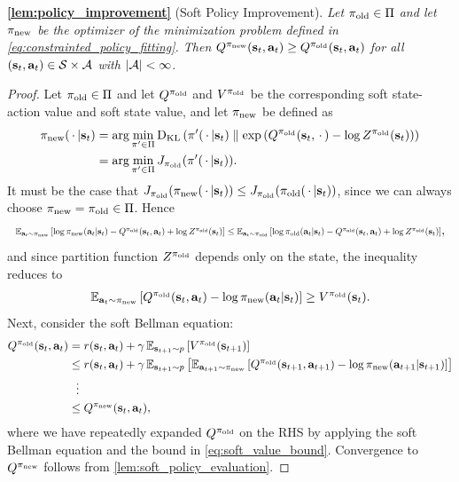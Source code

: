 \textbf{\autoref{lem:policy_improvement}} (Soft Policy Improvement).\textit{
Let $\pi_\mathrm{old} \in \Pi$ and let $\pi_\mathrm{new}$ be the optimizer of the minimization problem defined in \autoref{eq:constrainted_policy_fitting}. Then $Q^{\pi_\mathrm{new}}({\mathbf{s}_t}, {\mathbf{a}_t}) \geq Q^{\pi_\mathrm{old}}({\mathbf{s}_t}, {\mathbf{a}_t})$ for all $({\mathbf{s}_t}, {\mathbf{a}_t}) \in \mathcal{S}\times\mathcal{A}$ with $|\mathcal{A}|<\infty$.}
\begin{proof}
Let ${\pi_\mathrm{old}}\in \Pi$ and let $Q^{\pi_\mathrm{old}}$ and $V^{\pi_\mathrm{old}}$ be the corresponding soft state-action value and soft state value, and let ${\pi_\mathrm{new}}$ be defined as 
\begin{align}
{\pi_\mathrm{new}}({\,\cdot\,}|{\mathbf{s}_t}) &= \arg \min_{\pi' \in \Pi}\mathrm{D_{KL}}\left(\pi'({\,\cdot\,}|{\mathbf{s}_t})\;\middle\|\;\exp\left(Q^{\pi_\mathrm{old}}({\mathbf{s}_t},{\,\cdot\,}) - \log Z^{\pi_\mathrm{old}}({\mathbf{s}_t})\right)\right)\notag\\
 &= \arg\min_{\pi'\in\Pi}J_{\pi_\mathrm{old}}(\pi'({\,\cdot\,}|{\mathbf{s}_t})).
\end{align}
It must be the case that $J_{\pi_\mathrm{old}}({\pi_\mathrm{new}}({\,\cdot\,}|{\mathbf{s}_t})) \leq J_{\pi_\mathrm{old}}({\pi_\mathrm{old}}({\,\cdot\,}|{\mathbf{s}_t}))$, since we can always choose ${\pi_\mathrm{new}} = {\pi_\mathrm{old}}\in\Pi$. Hence
\begin{align}
\resizebox{1\textwidth}{!}{$
\E{\at\sim\policynew}{\log \policynew(\at|\st) - Q^\policyold(\st, \at) + \log Z^\policyold(\st)}
\leq \E{\at\sim\policyold}{\log \policyold(\at|\st) - Q^\policyold(\st,\at) + \log Z^\policyold(\st)}$},
\end{align}
and since partition function $Z^{\pi_\mathrm{old}}$ depends only on the state, the inequality reduces to
\begin{align}
\operatorname{\mathbb{E}}_{{\mathbf{a}_t}\sim{\pi_\mathrm{new}}}\left[Q^{\pi_\mathrm{old}}({\mathbf{s}_t}, {\mathbf{a}_t}) - \log {\pi_\mathrm{new}}({\mathbf{a}_t}|{\mathbf{s}_t})\right] \geq V^{\pi_\mathrm{old}}({\mathbf{s}_t}).
\label{eq:soft_value_bound}
\end{align}
Next, consider the soft Bellman equation:
\begin{align}
Q^{\pi_\mathrm{old}}({\mathbf{s}_t}, {\mathbf{a}_t}) &= r({\mathbf{s}_t}, {\mathbf{a}_t}) + \gamma\operatorname{\mathbb{E}}_{{\mathbf{s}_{t+1}}\sim p}\left[V^{\pi_\mathrm{old}}({\mathbf{s}_{t+1}})\right]\notag\\
&\leq r({\mathbf{s}_t}, {\mathbf{a}_t}) + \gamma\operatorname{\mathbb{E}}_{{\mathbf{s}_{t+1}}\sim p}\left[\operatorname{\mathbb{E}}_{{\mathbf{a}_{t+1}}\sim{\pi_\mathrm{new}}}\left[Q^{\pi_\mathrm{old}}({\mathbf{s}_{t+1}}, {\mathbf{a}_{t+1}}) - \log {\pi_\mathrm{new}}({\mathbf{a}_{t+1}}|{\mathbf{s}_{t+1}})\right]\right]\notag\\
&\ \  \vdots\notag\\
& \leq Q^{\pi_\mathrm{new}}({\mathbf{s}_t}, {\mathbf{a}_t}),
\end{align}
where we have repeatedly expanded $Q^{\pi_\mathrm{old}}$ on the RHS by applying the soft Bellman equation and the bound in \autoref{eq:soft_value_bound}. Convergence to $Q^{\pi_\mathrm{new}}$ follows from \autoref{lem:soft_policy_evaluation}.
\end{proof}


